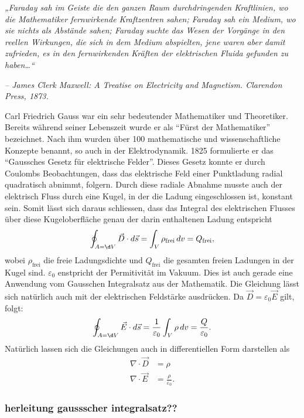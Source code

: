 \begin{flushleft}
\emph{„Faraday sah im Geiste die den ganzen Raum durchdringenden Kraftlinien, wo die Mathematiker fernwirkende Kraftzentren sahen; Faraday sah ein Medium, wo sie nichts als Abstände sahen; Faraday suchte das Wesen der Vorgänge in den reellen Wirkungen, die sich in dem Medium abspielten, jene waren aber damit zufrieden, es in den fernwirkenden Kräften der elektrischen Fluida gefunden zu haben…“}

\emph{– James Clerk Maxwell: A Treatise on Electricity and Magnetism. Clarendon Press, 1873.}
\end{flushleft}

Carl Friedrich Gauss war ein sehr bedeutender Mathematiker und Theoretiker.
Bereits während seiner Lebenszeit wurde er als ``Fürst der Mathematiker'' bezeichnet.
Nach ihm wurden über 100 mathematische und wissenschaftliche Konzepte benannt, so auch in der Elektrodynamik.
1825 formulierte er das ``Gaussches Gesetz für elektrische Felder''.
Dieses Gesetz konnte er durch Coulombs Beobachtungen, dass das elektrische Feld einer Punktladung radial quadratisch abnimmt, folgern.
Durch diese radiale Abnahme musste auch der elektrisch Fluss durch eine Kugel, in der die Ladung eingeschlossen ist, konstant sein.
Somit lässt sich daraus schliessen, dass das Integral des elektrischen Flusses über diese Kugeloberfläche genau der darin enthaltenen Ladung entspricht
\[
\oint_{A=\d V} \vec{D} \cdot d\vec{s}
=
\int_{V} \rho_{\text{frei}}\, dv
=
Q_{\text{frei}} ,
\]
wobei $\rho_{\text{frei}}$ die freie Ladungsdichte und $Q_{\text{frei}}$ die gesamten freien Ladungen in der Kugel sind. $\varepsilon_0$ enstpricht der Permitivität im Vakuum. Dies ist auch gerade eine Anwendung vom Gausschen Integralsatz aus der Mathematik.
Die Gleichung lässt sich natürlich auch mit der elektrischen Feldstärke ausdrücken. Da $\vec{D} = \varepsilon_0 \vec{E}$ gilt, folgt:
\[
\oint_{A=\d V} \vec{E} \cdot d\vec{s}
=
\frac{1}{\varepsilon_0}\int_{V} \rho\, dv
=
\frac{Q}{\varepsilon_0} .
\]
Natürlich lassen sich die Gleichungen auch in differentiellen Form darstellen als
\begin{align*}
	\nabla \cdot \vec{D}
	&=
	\rho
	\\
	\nabla \cdot \vec{E}
	&=
	\frac{\rho}{\varepsilon_0} .
\end{align*}
\cite{maxwell:Gaußscher_Integralsatz}
\cite{maxwell:Carl_Friedrich_Gauß}

\subsubsection{herleitung gaussscher integralsatz??}

